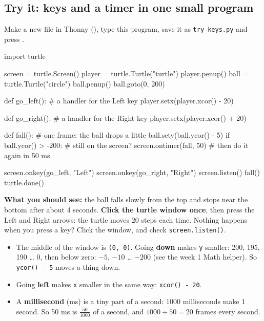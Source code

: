\subsection{Try it: keys and a timer in one small program}
Make a new file in Thonny (), type this program, save it as \texttt{try\_keys.py} and press .
\begin{pycode}
import turtle

screen = turtle.Screen()
player = turtle.Turtle("turtle")
player.penup()
ball = turtle.Turtle("circle")
ball.penup()
ball.goto(0, 200)

def go_left():                    # a handler for the Left key
    player.setx(player.xcor() - 20)

def go_right():                   # a handler for the Right key
    player.setx(player.xcor() + 20)

def fall():                       # one frame: the ball drops a little
    ball.sety(ball.ycor() - 5)
    if ball.ycor() > -200:        # still on the screen?
        screen.ontimer(fall, 50)  # then do it again in 50 ms

screen.onkey(go_left, "Left")
screen.onkey(go_right, "Right")
screen.listen()
fall()
turtle.done()
\end{pycode}
\textbf{What you should see:} the ball falls slowly from the top and stops near the bottom after about 4 seconds.
\textbf{Click the turtle window once}, then press the Left and Right arrows: the turtle moves 20 steps each time.
Nothing happens when you press a key? Click the window, and check \texttt{screen.listen()}.

\begin{tip}
\begin{itemize}[leftmargin=1.2em,itemsep=0pt]
  \item The middle of the window is \texttt{(0, 0)}. Going \textbf{down} makes \texttt{y} smaller: 200, 195, 190 \ldots{} 0, then
        below zero: $-5$, $-10$ \ldots{} $-200$ (see the week 1 Math helper). So \texttt{ycor() - 5} moves a thing down.
  \item Going \textbf{left} makes \texttt{x} smaller in the same way: \texttt{xcor() - 20}.
  \item A \textbf{millisecond} (ms) is a tiny part of a second: 1000 milliseconds make 1 second.
        So 50 ms is $\frac{50}{1000}$ of a second, and $1000 \div 50 = 20$ frames every second.
\end{itemize}
\end{tip}

